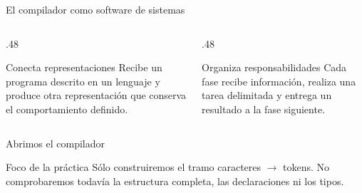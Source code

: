 \documentclass[11pt,spanish]{beamer}
\begin{document}
\begin{frame}{El compilador como software de sistemas}
\vfill

\begin{columns}[T,onlytextwidth]
\begin{column}{.48\textwidth}
\begin{block}{Conecta representaciones}
Recibe un programa descrito en un lenguaje y produce otra representación que conserva el comportamiento definido.
\end{block}
\end{column}
\begin{column}{.48\textwidth}
\begin{block}{Organiza responsabilidades}
Cada fase recibe información, realiza una tarea delimitada y entrega un resultado a la fase siguiente.
\end{block}
\end{column}
\end{columns}

\bigskip

\begin{center}
\end{center}

\vfill
\end{frame}

\begin{frame}{Abrimos el compilador}
\vfill

\begin{center}
\end{center}

\bigskip

\begin{block}{Foco de la práctica}
Sólo construiremos el tramo caracteres \(\rightarrow\) tokens. No comprobaremos todavía la estructura completa, las declaraciones ni los tipos.
\end{block}

\vfill
\end{frame}
\end{document}
